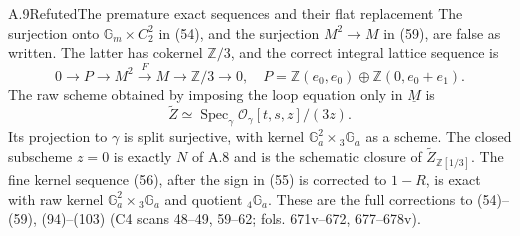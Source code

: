 \begin{statement}{A.9}{Refuted}{The premature exact sequences and their flat replacement}
The surjection onto $\mathbb G_m\times C_2^2$ in (54), and the
surjection $M^2\to M$ in (59), are false as written. The latter has
cokernel $\mathbb Z/3$, and the correct integral lattice sequence is
\[
 0\to P\to M^2\xrightarrow F M\to\mathbb Z/3\to0,
 \quad P=\mathbb Z(e_0,e_0)\oplus
               \mathbb Z(0,e_0+e_1).              \tag{A.9.1}
\]
The raw scheme obtained by imposing the loop equation only in
$\underline M$ is
\[
 \widetilde Z\simeq
 \operatorname{Spec}_{\gamma}
     \mathcal O_\gamma[t,s,z]/(3z).                \tag{A.9.2}
\]
Its projection to $\gamma$ is split surjective, with kernel
$\mathbb G_a^2\times{}_3\mathbb G_a$ as a scheme. The closed subscheme
$z=0$ is exactly $N$ of A.8 and is the schematic closure of
$\widetilde Z_{\mathbb Z[1/3]}$.
The fine kernel sequence (56), after the sign in (55) is corrected
to $1-R$, is exact with raw kernel
$\mathbb G_a^2\times{}_3\mathbb G_a$ and quotient
${}_4\mathbb G_a$. These are the full corrections to (54)--(59),
(94)--(103) (C4 scans 48--49, 59--62; fols. 671v--672, 677--678v).
\end{statement}
